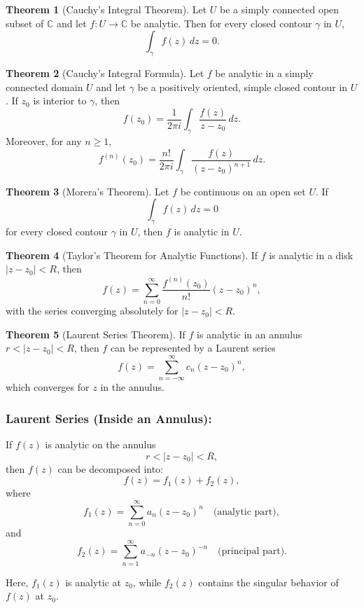 \documentclass[12pt]{article}
\theoremstyle{definition} %
\newtheorem{theorem}{Theorem}
\theoremstyle{plain} %
\begin{document}
\begin{theorem}[Cauchy's Integral Theorem]
Let \(U\) be a simply connected open subset of \(\mathbb{C}\) and let \(f: U \to \mathbb{C}\) be analytic. Then for every closed contour \(\gamma\) in \(U\),
\[
\int_\gamma f(z)\,dz = 0.
\]
\end{theorem}

\begin{theorem}[Cauchy's Integral Formula]
Let \(f\) be analytic in a simply connected domain \(U\) and let \(\gamma\) be a positively oriented, simple closed contour in \(U\). If \(z_0\) is interior to \(\gamma\), then
\[
f(z_0) = \frac{1}{2\pi i} \int_\gamma \frac{f(z)}{z-z_0}\,dz.
\]
Moreover, for any \(n \geq 1\),
\[
f^{(n)}(z_0) = \frac{n!}{2\pi i} \int_\gamma \frac{f(z)}{(z-z_0)^{n+1}}\,dz.
\]
\end{theorem}

\begin{theorem}[Morera's Theorem]
Let \(f\) be continuous on an open set \(U\). If
\[
\int_\gamma f(z)\,dz = 0
\]
for every closed contour \(\gamma\) in \(U\), then \(f\) is analytic in \(U\).
\end{theorem}

\begin{theorem}[Taylor's Theorem for Analytic Functions]
If \(f\) is analytic in a disk \(|z-z_0| < R\), then
\[
f(z) = \sum_{n=0}^{\infty} \frac{f^{(n)}(z_0)}{n!}(z-z_0)^n,
\]
with the series converging absolutely for \(|z-z_0| < R\).
\end{theorem}

\begin{theorem}[Laurent Series Theorem]
If \(f\) is analytic in an annulus \(r < |z-z_0| < R\), then \(f\) can be represented by a Laurent series
\[
f(z) = \sum_{n=-\infty}^{\infty} c_n (z-z_0)^n,
\]
which converges for \(z\) in the annulus.
\end{theorem}

\subsubsection*{Laurent Series (Inside an Annulus):}

If \( f(z) \) is analytic on the annulus 
\[
r < |z - z_0| < R,
\]
then \( f(z) \) can be decomposed into:
\[
f(z) = f_1(z) + f_2(z),
\]
where
\[
f_1(z) = \sum_{n=0}^{\infty} a_n (z - z_0)^n \quad\text{(analytic part)},
\]
and
\[
f_2(z) = \sum_{n=1}^{\infty} a_{-n} (z - z_0)^{-n} \quad\text{(principal part)}.
\]

Here, \(f_1(z)\) is analytic at \(z_0\), while \(f_2(z)\) contains the singular behavior of \(f(z)\) at \(z_0\).
\end{document}
